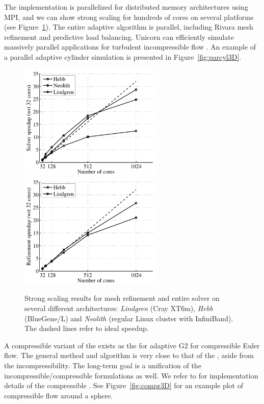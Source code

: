 The  implementation is parallelized for distributed
memory architectures using MPI, and we can show strong scaling for
hundreds of cores on several platforms (see
Figure~\ref{fig:hoffman-2:sp}). The entire adaptive algorithm is
parallel, including Rivara mesh refinement and \apriori{} predictive
load balancing. Unicorn can efficiently simulate massively parallel
applications for turbulent incompressible flow
\citep{JanssonHoffmanJansson2010, Jansson2011}. An example of a
parallel adaptive cylinder simulation is presented in
Figure~\ref{fig:parcyl3D}.

\begin{figure}
  \centering
  \includegraphics[height=5.5cm]{chapters/hoffman-2/pdf/speedup_solve.pdf}
  \includegraphics[height=5.5cm]{chapters/hoffman-2/pdf/speedup_unrivara.pdf}
  \caption{\label{fig:hoffman-2:sp} Strong scaling results for mesh
    refinement and entire solver on several different architectures:
    \textit{Lindgren} (Cray XT6m), \textit{Hebb} (BlueGene/L) and
    \textit{Neolith} (regular Linux cluster with InfiniBand). The
    dashed lines refer to ideal speedup.}
\end{figure}

A compressible variant of the  exists as the
 for adaptive G2 for compressible Euler flow. The
general method and algorithm is very close to that of the
, aside from the incompressibility. The long-term goal
is a unification of the incompressible/compressible formulations as
well. We refer to \citet{Nazarov2009} for implementation details of
the compressible . See Figure~\ref{fig:compr3D} for an
example plot of compressible flow around a sphere.

